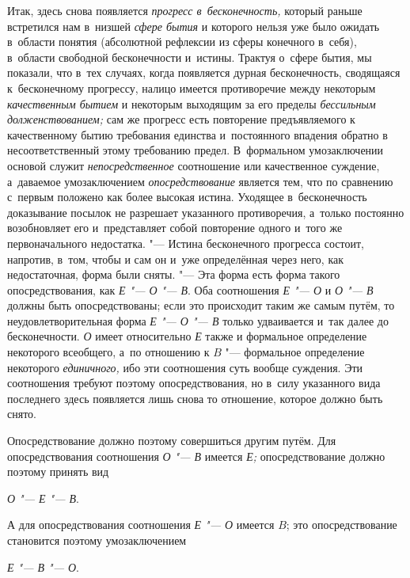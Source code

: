 Итак, здесь снова появляется
{\em прогресс в~бесконечность,}
который раньше встретился нам в~низшей
{\em сфере бытия} и
которого нельзя уже было ожидать в~области понятия (абсолютной рефлексии из
сферы конечного в~себя), в~области свободной бесконечности и~истины.
Трактуя о~сфере бытия, мы показали, что в~тех случаях, когда появляется
дурная бесконечность, сводящаяся к~бесконечному прогрессу, налицо имеется
противоречие между некоторым
{\em качественным бытием}
и некоторым выходящим за его пределы
{\em бессильным долженствованием;}
сам же прогресс есть повторение предъявляемого к
качественному бытию требования единства и~постоянного впадения обратно в
несоответственный этому требованию предел. В~формальном умозаключении
основой служит {\em непосредственное}
соотношение или качественное суждение, а~даваемое
умозаключением {\em опосредствование}
является тем, что по сравнению с~первым положено как более
высокая истина. Уходящее в~бесконечность доказывание посылок не разрешает
указанного противоречия, а~только постоянно возобновляет его и~представляет
собой повторение одного и~того же первоначального недостатка. "---
Истина бесконечного прогресса состоит, напротив, в~том, чтобы
и сам он и~уже определённая через него, как недостаточная, форма были
сняты. "--- Эта форма есть форма такого опосредствования, как
{\em Е "--- О "--- В}. Оба соотношения {\em Е "--- О} и {\em О
"--- В} должны быть опосредствованы; если это
происходит таким же самым путём, то неудовлетворительная форма {\em Е "--- О
"--- В} только удваивается и~так далее до
бесконечности. {\em О} имеет относительно {\em Е} также и
формальное определение некоторого всеобщего, а~по отношению к
$B$ "--- формальное определение некоторого
{\em единичного,} ибо эти
соотношения суть вообще суждения. Эти соотношения требуют поэтому
опосредствования, но в~силу указанного вида последнего здесь появляется
лишь снова то отношение, которое должно быть снято.

Опосредствование должно поэтому совершиться другим путём. Для
опосредствования соотношения {\em О "--- В} имеется
{\em Е;} опосредствование должно поэтому принять вид

{\centering
{\em О "--- Е
"--- В}.
\par}

А для опосредствования соотношения {\em Е "--- О}
имеется $B$; это опосредствование становится поэтому умозаключением

{\centering
{\em Е "--- В
"--- О}.
\par}

